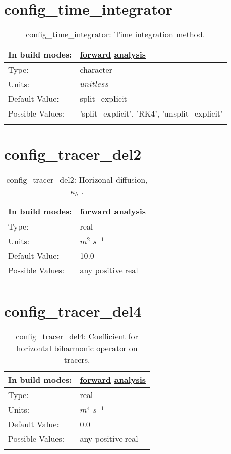 \section[config\_time\_integrator]{config\_time\_integrator}
\label{sec:nm_sec_config_time_integrator}
\begin{center}
\begin{longtable}{| p{2.0in} || p{4.0in} |}
    \hline
    In build modes: & \hyperref[subsec:forward_nm_tab_time_integration]{forward} \hyperref[subsec:analysis_nm_tab_time_integration]{analysis} \\
    \hline
    Type: & character \\
    \hline
    Units: & $unitless$ \\
    \hline
    Default Value: & split\_explicit \\
    \hline
    Possible Values: & 'split\_explicit', 'RK4', 'unsplit\_explicit' \\
    \hline
    \caption{config\_time\_integrator: Time integration method.}
\end{longtable}
\end{center}
\section[config\_tracer\_del2]{config\_tracer\_del2}
\label{sec:nm_sec_config_tracer_del2}
\begin{center}
\begin{longtable}{| p{2.0in} || p{4.0in} |}
    \hline
    In build modes: & \hyperref[subsec:forward_nm_tab_hmix_del2]{forward} \hyperref[subsec:analysis_nm_tab_hmix_del2]{analysis} \\
    \hline
    Type: & real \\
    \hline
    Units: & $m^2$ $s^{-1}$ \\
    \hline
    Default Value: & 10.0 \\
    \hline
    Possible Values: & any positive real \\
    \hline
    \caption{config\_tracer\_del2:  Horizonal diffusion,  $\kappa_h$ .}
\end{longtable}
\end{center}
\section[config\_tracer\_del4]{config\_tracer\_del4}
\label{sec:nm_sec_config_tracer_del4}
\begin{center}
\begin{longtable}{| p{2.0in} || p{4.0in} |}
    \hline
    In build modes: & \hyperref[subsec:forward_nm_tab_hmix_del4]{forward} \hyperref[subsec:analysis_nm_tab_hmix_del4]{analysis} \\
    \hline
    Type: & real \\
    \hline
    Units: & $m^4$ $s^{-1}$ \\
    \hline
    Default Value: & 0.0 \\
    \hline
    Possible Values: & any positive real \\
    \hline
    \caption{config\_tracer\_del4: Coefficient for horizontal biharmonic operator on tracers.}
\end{longtable}
\end{center}
